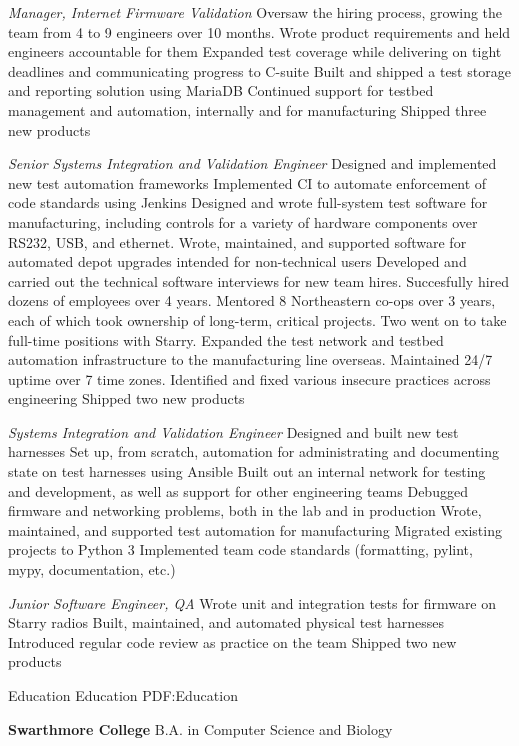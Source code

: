 \documentclass[letterpaper,MMMyyyy,nonstopmode]{simpleresumecv}
\begin{document}
\begin{Body}
\BigGap
\textit{Manager, Internet Firmware Validation}
\Gap
\BulletItem
Oversaw the hiring process, growing the team from 4 to 9 engineers over 10
months.
\BulletItem
Wrote product requirements and held engineers accountable for them
\BulletItem
Expanded test coverage while delivering on tight deadlines and
communicating progress to C-suite
\BulletItem
Built and shipped a test storage and reporting solution using MariaDB
\BulletItem
Continued support for testbed management and automation, internally and for
manufacturing
\BulletItem
Shipped three new products

\BigGap
\textit{Senior Systems Integration and Validation Engineer}
\Gap
\BulletItem
Designed and implemented new test automation frameworks
\BulletItem
Implemented CI to automate enforcement of code standards using Jenkins
\BulletItem
Designed and wrote full-system test software for manufacturing,
including controls for a variety of hardware components over RS232,
USB, and ethernet.
\BulletItem
Wrote, maintained, and supported software for automated depot upgrades
intended for non-technical users
\BulletItem
Developed and carried out the technical software interviews for new
team hires. Succesfully hired dozens of employees over 4 years.
\BulletItem
Mentored 8 Northeastern co-ops over 3 years, each of which took ownership of
long-term, critical projects. Two went on to take full-time positions with
Starry.
\BulletItem
Expanded the test network and testbed automation infrastructure to the
manufacturing line overseas. Maintained 24/7 uptime over 7 time zones.
\BulletItem
Identified and fixed various insecure practices across engineering
\BulletItem
Shipped two new products

\BigGap
\textit{Systems Integration and Validation Engineer}
\Gap
\BulletItem
Designed and built new test harnesses
\BulletItem
Set up, from scratch, automation for administrating and documenting
state on test harnesses using Ansible
\BulletItem
Built out an internal network for testing and development, as well
as support for other engineering teams
\BulletItem
Debugged firmware and networking problems, both in the lab and in production
\BulletItem
Wrote, maintained, and supported test automation for manufacturing
\BulletItem
Migrated existing projects to Python 3
\BulletItem
Implemented team code standards (formatting, pylint, mypy, documentation, etc.)

\BigGap
\textit{Junior Software Engineer, QA}
\Gap
\BulletItem
Wrote unit and integration tests for firmware on Starry radios
\BulletItem
Built, maintained, and automated physical test harnesses
\BulletItem
Introduced regular code review as practice on the team
\BulletItem
Shipped two new products

\Section
{Education}
{Education}
{PDF:Education}

\Entry
\textbf{Swarthmore College}
\Gap
B.A. in Computer Science and Biology

\end{Body}
\end{document}
